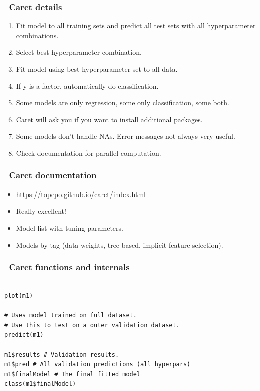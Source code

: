 \documentclass[handout, aspectratio = 169]{beamer}
\begin{document}
\begin{frame}
\frametitle{\insertframenumber~Caret details}
\begin{enumerate}
\item Fit model to all training sets and predict all test sets with all hyperparameter combinations.
\item Select best hyperparameter combination.
\item Fit model using best hyperparameter set to all data.
\item If y is a factor, automatically do classification.
\item Some models are only regression, some only classification, some both.
\item Caret will ask you if you want to install additional packages.
\item Some models don't handle NAs. Error messages not always very useful.
\item Check documentation for parallel computation.
\end{enumerate}

\end{frame} 



\begin{frame}
\frametitle{\insertframenumber~Caret documentation}

\begin{itemize}
\item https://topepo.github.io/caret/index.html
\item Really excellent!
\item Model list with tuning parameters.
\item Models by tag (data weights, tree-based, implicit feature selection).
\end{itemize}
\end{frame} 




\begin{frame}[fragile]
\frametitle{\insertframenumber~Caret functions and internals}
\begin{Verbatim}

plot(m1)

# Uses model trained on full dataset.
# Use this to test on a outer validation dataset.
predict(m1) 

m1$results # Validation results.
m1$pred # All validation predictions (all hyperpars)
m1$finalModel # The final fitted model
class(m1$finalModel)


\end{Verbatim}

\end{frame} 
\end{document}
